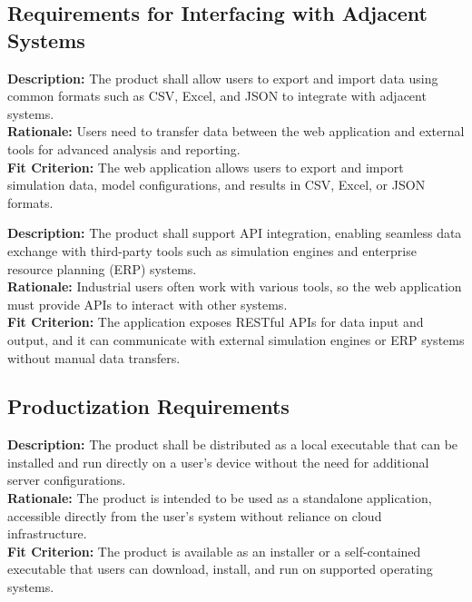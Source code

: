 \documentclass[12pt]{article}
\begin{document}
\vspace{0.5cm}

\subsection{Requirements for Interfacing with Adjacent Systems}

\begin{tcolorbox}[title=OEIA1]
\textbf{Description:} The product shall allow users to export and import data using common formats such as CSV, Excel, and JSON to integrate with adjacent systems. \\
\textbf{Rationale:} Users need to transfer data between the web application and external tools for advanced analysis and reporting. \\
\textbf{Fit Criterion:} The web application allows users to export and import simulation data, model configurations, and results in CSV, Excel, or JSON formats.
\end{tcolorbox}

\vspace{0.5cm}

\begin{tcolorbox}[title=OEIA2]
\textbf{Description:} The product shall support API integration, enabling seamless data exchange with third-party tools such as simulation engines and enterprise resource planning (ERP) systems. \\
\textbf{Rationale:} Industrial users often work with various tools, so the web application must provide APIs to interact with other systems. \\
\textbf{Fit Criterion:} The application exposes RESTful APIs for data input and output, and it can communicate with external simulation engines or ERP systems without manual data transfers.
\end{tcolorbox}

\vspace{0.5cm}

\subsection{Productization Requirements}

\begin{tcolorbox}[title=OEP1]
\textbf{Description:} The product shall be distributed as a local executable that can be installed and run directly on a user's device without the need for additional server configurations. \\
\textbf{Rationale:} The product is intended to be used as a standalone application, accessible directly from the user's system without reliance on cloud infrastructure. \\
\textbf{Fit Criterion:} The product is available as an installer or a self-contained executable that users can download, install, and run on supported operating systems.
\end{tcolorbox}
\end{document}
